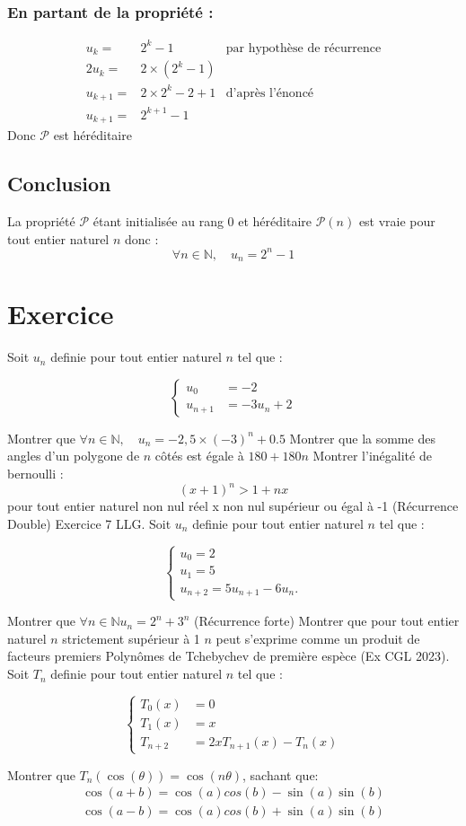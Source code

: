 \documentclass{exam}
\newcommand*{\p}{\mathcal{P}}
\newcommand*{\n}{\mathbb{N}}
\newcommand*{\sys}[1]{
  \[
\left\{
\begin{array}{lll}
  #1
\end{array}
\right .
\]
}
\begin{document}
\subsubsection{En partant de la propriété :}
\begin{align*}
u_k=&2^k-1
&
\text{par hypothèse de récurrence}
\\
2u_k=&2\times\left(2^k-1\right)
\\
u_{k+1}=&2\times2^k-2+1
&
\text{d'après l'énoncé}
\\
u_{k+1}=&2^{k+1}-1
\end{align*}
Donc $\p$ est héréditaire
\subsection{Conclusion}
La propriété $\p$ étant initialisée au rang 0 et héréditaire $\p(n)$ est vraie pour
tout entier naturel $n$ donc :
$$
\forall n\in\n,
\quad
u_n=2^n-1
$$
\section{Exercice}
\begin{questions}
\question Soit $u_n$ definie pour tout entier naturel $n$ tel que :
\sys{
u_0&=-2\\
u_{n+1}&=-3u_n+2
}
Montrer que $
\forall n\in\n,
\quad
u_n=-2,5\times(-3)^n+0.5
$
\question Montrer que la somme des angles d'un polygone de $n$ côtés est égale à $180+180n$
\question Montrer l'inégalité de bernoulli : 
$$
(x+1)^n>1+nx
$$
pour tout entier naturel non nul réel x non nul supérieur ou égal à -1
\question (Récurrence Double) Exercice 7 LLG. Soit $u_n$ definie pour tout entier naturel $n$ tel que :
\sys{
u_0 = 2
\\
u_1 = 5
\\
u_{n+2} = 5u_{n+1} - 6u_n.
}
Montrer que
$\forall n\in\n u_n = 2^n + 3^n$
\question (Récurrence forte) Montrer que pour tout entier naturel $n$ strictement supérieur à 1 
$n$ peut s'exprime comme un produit de facteurs premiers
\question Polynômes de Tchebychev de première espèce (Ex CGL 2023).
Soit $T_n$ definie pour tout entier naturel $n$ tel que :
\sys{
T_0(x)&=0
\\
T_1(x)&=x
\\
T_{n+2}&=2xT_{n+1}(x)-T_n(x)
}
Montrer que $T_n(\cos(\theta))=\cos(n\theta)$, sachant que:
\begin{align*}
\cos(a+b)=\cos(a)cos(b)-\sin(a)\sin(b)\\
\cos(a-b)=\cos(a)cos(b)+\sin(a)\sin(b)
\end{align*}
\end{questions}
\end{document}
